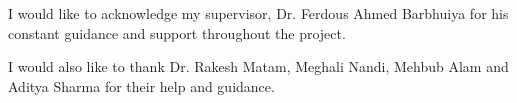 
\begin{acknowledgements}
    I would like to acknowledge my supervisor, Dr. Ferdous Ahmed Barbhuiya for
    his constant guidance and support throughout the project.

    I would also like to thank Dr. Rakesh Matam, Meghali Nandi, Mehbub Alam and
    Aditya Sharma for their help and guidance.
\end{acknowledgements}
